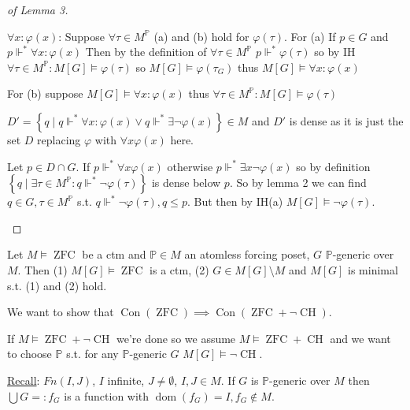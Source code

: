 \documentclass{scrartcl}
\newcommand{\set}[1]{\left\{#1\right\}}
\DeclareMathOperator{\Con}{Con}
\DeclareMathOperator{\ZFC}{ZFC}
\DeclareMathOperator{\CH}{CH}
\DeclareMathOperator{\dom}{dom}
\theoremstyle{definition}
\theoremstyle{plain}
\theoremstyle{remark}
\begin{document}
\begin{proof}[of Lemma 3]
\begin{enumerate}[(a)]
			$\forall x: \varphi(x)$: Suppose $\forall \tau \in M^\mathbb{P}$ (a) and (b)
			hold for $\varphi(\tau)$. For (a) If $p \in G$ and $p \Vdash^* \forall x: \varphi(x)$
			Then by the definition of $\forall \tau \in M^\mathbb{P}$ $p\Vdash^* \varphi(\tau)$
			so by IH $\forall \tau \in M^\mathbb{P}: M[G] \vDash \varphi(\tau)$
			so $M[G] \vDash \varphi(\tau_G)$ thus $M[G] \vDash \forall x: \varphi(x)$

			For (b) suppose $M[G] \vDash \forall x: \varphi(x)$ thus $\forall \tau \in
			M^\mathbb{P}: M[G] \vDash \varphi(\tau)$

			$D' = \set{q \mid q \Vdash^* \forall x: \varphi(x) \lor q \Vdash^* \exists
			\lnot \varphi(x)} \in M$ and $D'$ is dense as it is just the set
			$D$ replacing $\varphi$ with $\forall x \varphi(x)$ here.

			Let $p \in D \cap G$. If $p \Vdash^* \forall x \varphi(x)$ otherwise
			$p \Vdash^* \exists x \lnot \varphi(x)$ so by definition 
			$\set{q \mid \exists \tau \in M^\mathbb{P}: q \Vdash^*\lnot \varphi(\tau)}$
			is dense below $p$. So by lemma 2 we can find $q \in G, \tau \in M^\mathbb{P}$
			s.t. $q \Vdash^* \lnot \varphi(\tau), q \leq p$.
			But then by IH(a) $M[G] \vDash \lnot \varphi(\tau)$.	
		\end{enumerate}
	\end{proof}
	Let $M \vDash \ZFC$ be a ctm and $\mathbb{P} \in M$ an atomless forcing poset,
	$G$ $\mathbb{P}$-generic over $M$. Then (1) $M[G] \vDash \ZFC$ is a ctm,
	(2) $G \in M[G] \setminus M$ and $M[G]$ is minimal s.t. (1) and (2) hold.

	We want to show that $\Con(\ZFC) \implies \Con(\ZFC + \lnot \CH)$.

	If $M\vDash \ZFC + \lnot \CH$ we're done so we assume $M\vDash \ZFC + \CH$
	and we want to choose $\mathbb{P}$ s.t. for any $\mathbb{P}$-generic $G$
	$M[G] \vDash \lnot \CH$.
	
	\underline{Recall}: $Fn(I, J)$, $I$ infinite, $J \neq \emptyset$, $I, J \in M$.
	If $G$ is $\mathbb{P}$-generic over $M$ then $\bigcup G =: f_G$ is a function
	with $\dom(f_G) = I, f_G \notin M$.
\end{document}
